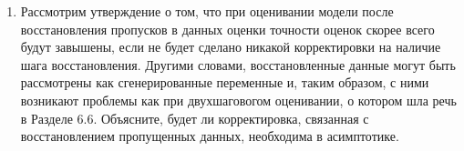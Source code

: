 \begin{enumerate}
\item Рассмотрим утверждение о том, что при оценивании модели после восстановления пропусков в данных  оценки точности оценок скорее всего будут завышены, если не будет сделано никакой корректировки на наличие шага восстановления. Другими словами, восстановленные данные могут быть рассмотрены как сгенерированные переменные и, таким образом, с ними возникают проблемы как при двухшаговогом оценивании, о котором шла речь в Разделе 6.6. Объясните, будет ли корректировка, связанная с восстановлением пропущенных данных, необходима в асимптотике.

\end{enumerate}



